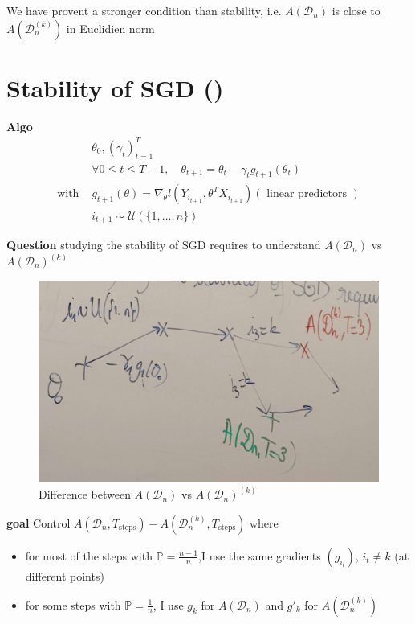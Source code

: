 \begin{note}[]
    We have provent a stronger condition than stability, i.e. $ A(\mathcal{D}_n) $ is close to $ A(\mathcal{D}_n ^{(k)}) $ in Euclidien norm 
\end{note}

\section{Stability of SGD ()}
\textbf{Algo} 
\begin{align*}
                &\theta _0 , (\gamma _t)_{t=1} ^T \\
                &\forall 0 \leq t \leq T-1, \quad \theta _{t+1} = \theta _t - \gamma _t g_{t+1} (\theta _t) \\
    \text{with }&g_{t+1}(\theta ) = \nabla _\theta l(Y_{i_{t+1}}, \theta^T X_{i_{t+1}} ) (\text{ linear predictors }) \\
                &i_{t+1} \sim \mathcal{U}(\{1, \dots, n\})
\end{align*}

\textbf{Question} studying the stability of SGD requires to understand $A(\mathcal{D}_n)$ vs $A(\mathcal{D}_n)^{(k)}$
\begin{figure}[!h]
    \centering
    \includegraphics[width=.65\textwidth]{figs/graph.jpg}
    \caption{Difference between $A(\mathcal{D}_n)$ vs $A(\mathcal{D}_n)^{(k)}$}
\end{figure}

\textbf{goal} Control $A(\mathcal{D}_n, T_{\text{steps}}) - A(\mathcal{D}_n^{(k)}, T_{\text{steps}})$ where
\begin{itemize}
    \item for most of the steps with $\mathbb{P} = \frac{n-1}{n}$,I use the same gradients $(g_{i_t})$, $i_t \neq k$ (at different points)
    \item for some steps with $\mathbb{P} = \frac{1}{n}$, I use $g_k$ for $A(\mathcal{D}_n)$ and $g'_k$ for $A(\mathcal{D}_n^{(k)})$
\end{itemize}


